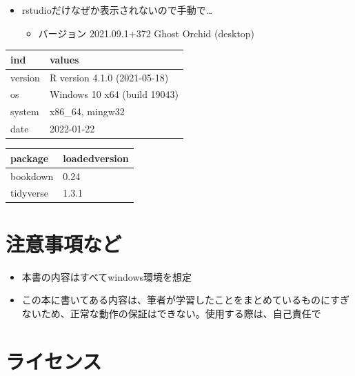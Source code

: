 \documentclass[
  xelatex,ja=standard, b5paper]{bxjsbook}
\providecommand{\tightlist}{%
  \setlength{\itemsep}{0pt}\setlength{\parskip}{0pt}}
\begin{document}
\begin{itemize}
\tightlist
\item
  rstudioだけなぜか表示されないので手動で\ldots{}

  \begin{itemize}
  \tightlist
  \item
    バージョン 2021.09.1+372 Ghost Orchid (desktop)
  \end{itemize}
\end{itemize}

\begin{table}
\centering
\begin{tabular}{l|l}
\hline
ind & values\\
\hline
version & R version 4.1.0 (2021-05-18)\\
\hline
os & Windows 10 x64 (build 19043)\\
\hline
system & x86\_64, mingw32\\
\hline
date & 2022-01-22\\
\hline
\end{tabular}
\end{table}

\begin{table}
\centering
\begin{tabular}{l|l}
\hline
package & loadedversion\\
\hline
bookdown & 0.24\\
\hline
tidyverse & 1.3.1\\
\hline
\end{tabular}
\end{table}

\hypertarget{ux6ce8ux610fux4e8bux9805ux306aux3069}{%
\section*{注意事項など}\label{ux6ce8ux610fux4e8bux9805ux306aux3069}}

\begin{itemize}
\tightlist
\item
  本書の内容はすべてwindows環境を想定
\item
  この本に書いてある内容は、筆者が学習したことをまとめているものにすぎないため、正常な動作の保証はできない。使用する際は、自己責任で
\end{itemize}

\hypertarget{ux30e9ux30a4ux30bbux30f3ux30b9}{%
\section*{ライセンス}\label{ux30e9ux30a4ux30bbux30f3ux30b9}}
\end{document}
